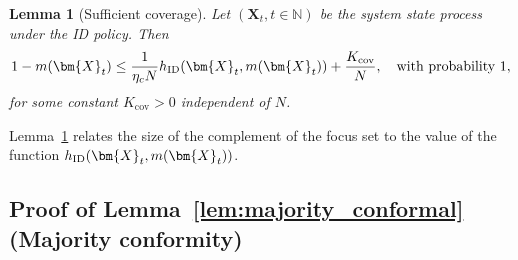 \documentclass{article}
\theoremstyle{plain}
\newtheorem{lemma}{Lemma}
\theoremstyle{remark}
\newcommand{\ID}{\textnormal{ID}}
\newcommand{\cov}{\text{cov}}
\def\mX{{\bm{X}}}
\begin{document}
\begin{lemma}[Sufficient coverage]\label{lem:coverage}
Let $(\mX_t,t\in\mathbb{N})$ be the system state process under the ID policy.
Then
\begin{align*}
    1-m(\mX_t)\leq \frac{1}{\eta_c N}h_{\ID}(\mX_t,m(\mX_t)) + \frac{K_{\cov}}{N},\quad\text{with probability }1,
\end{align*}
for some constant $K_{\cov}>0$ independent of $N$.
\end{lemma}
Lemma~\ref{lem:coverage} relates the size of the complement of the focus set to the value of the function $h_{\ID}(\mX_t,m(\mX_t))$.


\subsection{Proof of Lemma~\ref{lem:majority_conformal} (Majority conformity)}
\end{document}
